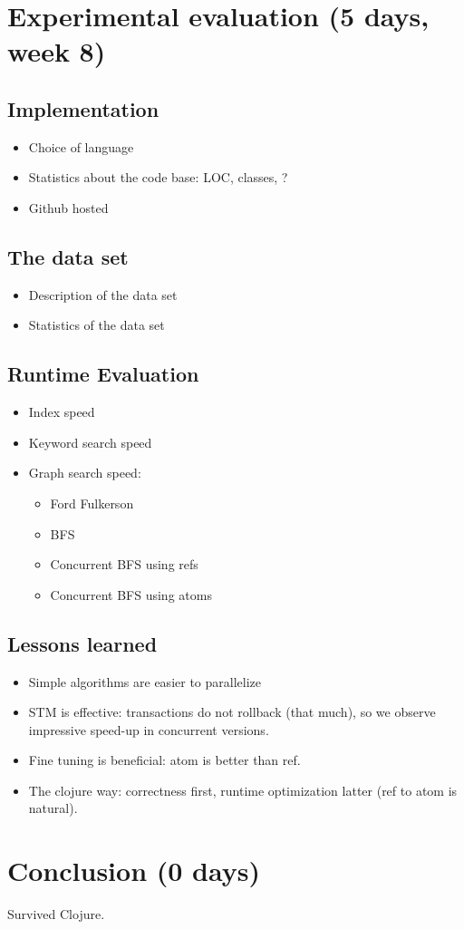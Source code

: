 \documentclass[grad]{uoit-thesis}
\begin{document}
	\chapter{Experimental evaluation (5 days, week 8)}
		\section{Implementation}
			\begin{itemize}
				\item Choice of language
				\item Statistics about the code base: LOC, classes, ?
				\item Github hosted
			\end{itemize}

		\section{The data set}
			\begin{itemize}
				\item Description of the data set
				\item Statistics of the data set
			\end{itemize}

		\section{Runtime Evaluation}
			\begin{itemize}
				\item Index speed
				\item Keyword search speed
				\item Graph search speed:
					\begin{itemize}
						\item Ford Fulkerson
						\item BFS
						\item Concurrent BFS using refs
						\item Concurrent BFS using atoms
					\end{itemize}
			\end{itemize}

		\section{Lessons learned}
			\begin{itemize}
				\item Simple algorithms are easier to parallelize
				\item STM is effective: transactions do not rollback (that much), so we observe impressive speed-up in concurrent versions.
				\item Fine tuning is beneficial: atom is better than ref.
				\item The clojure way: correctness first, runtime optimization latter (ref to atom is natural).
			\end{itemize}

			\chapter{Conclusion (0 days)}
				Survived Clojure.

	\appendix
	
	\begin{singlespaced}
		
	\end{singlespaced}
	
	\printbibliography
	
	\todos
\end{document}

